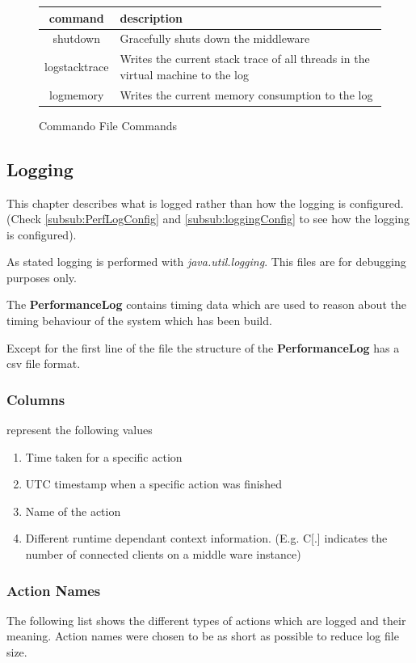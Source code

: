 \documentclass[a4paper]{article}
\begin{document}
\begin{figure}[H]
  \begin{center}
\begin{tabular}{|c|l|}
\hline 
command & description \\ 
\hline 
shutdown & Gracefully shuts down the middleware \\ 
logstacktrace & Writes the current stack trace of all threads in the virtual machine to the log \\ 
logmemory & Writes the current memory consumption to the log \\ 
\hline
\end{tabular} 
  \end{center}
  \caption{Commando File Commands}
\end{figure}


\subsection{Logging}
This chapter describes what is logged rather than how the logging is configured. (Check \ref{subsub:PerfLogConfig} and \ref{subsub:loggingConfig} to see how the logging is configured).

As stated logging is performed with \textit{java.util.logging}. This files are for debugging purposes only.

The \textbf{PerformanceLog} contains timing data which are used to reason about the timing behaviour of the system which has been build.

Except for the first line of the file the structure of the \textbf{PerformanceLog} has a csv file format.


\subsubsection{Columns} represent the following values
\begin{enumerate}
\item Time taken for a specific action
\item UTC timestamp when a specific action was finished
\item Name of the action
\item Different runtime dependant context information. (E.g. C[.] indicates the number of connected clients on a middle ware instance)
\end{enumerate}

\subsubsection{Action Names}
\label{subsub:PerfLogger-ActionNames}
The following list shows the different types of actions which are logged and their meaning. Action names were chosen to be as short as possible to reduce log file size.
\end{document}
